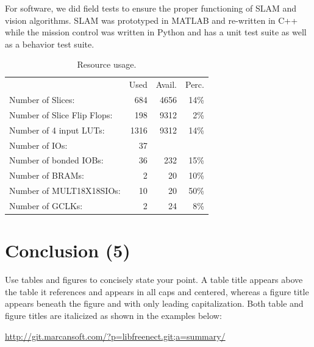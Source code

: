 \documentclass[12pt, letterpaper]{article}
\begin{document}
For software, we did field tests to ensure the proper functioning of SLAM and vision algorithms.  SLAM was prototyped in MATLAB and re-written in C++ while the mission control was written in Python and has a unit test suite as well as a behavior test suite. 

\begin{table}[h]
\centering
\begin{tabular}{l  r  r  r}
                                       & Used  & Avail. & Perc. \\
  Number of Slices:                    &  684  & 4656  &  14\%  \\
  Number of Slice Flip Flops:          &  198  & 9312  &   2\%  \\
  Number of 4 input LUTs:              & 1316  & 9312  &  14\%  \\
  Number of IOs:                       &   37  &       &      \\
  Number of bonded IOBs:               &   36  &  232  &  15\%  \\
  Number of BRAMs:                     &    2  &   20  &  10\%  \\
  Number of MULT18X18SIOs:             &   10  &   20  &  50\%  \\
  Number of GCLKs:                     &    2  &   24  &   8\%  \\
\end{tabular}
\caption{Resource usage.}
\label{tab:usage}
\end{table}


\section{Conclusion (5)}
Use tables and figures to concisely state your point. A table title appears above the table it references and appears in all caps and centered, whereas a figure title appears beneath the figure and with only leading capitalization. Both table and figure titles are italicized as shown in the examples below:



\begin{thebibliography}{10}
 \url{http://git.marcansoft.com/?p=libfreenect.git;a=summary/}
\end{thebibliography}
\end{document}
